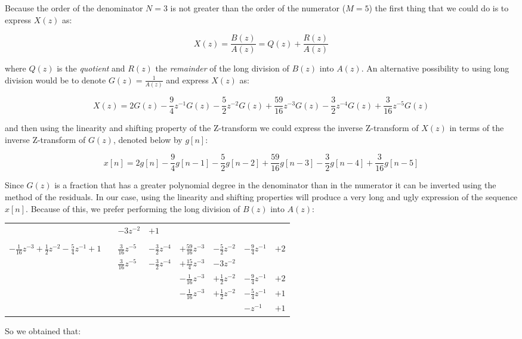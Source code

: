 \documentclass[a4paper,12pt,oneside]{article}
\begin{document}
Because the order of the denominator $N=3$ is not greater than the order of the numerator ($M=5$) the first thing that we could do is to express $X(z)$ as:

\begin{equation}\label{longdivision}
X(z)=\frac{B(z)}{A(z)}=Q(z)+\frac{R(z)}{A(z)}
\end{equation} 

where $Q(z)$ is the \emph{quotient} and $R(z)$ the \emph{remainder} of the long division of $B(z)$ into $A(z)$. An alternative possibility to using long division would be to denote $G(z)=\frac{1}{A(z)}$ and express $X(z)$ as:

\[
X(z) = 2G(z)-\frac{9}{4}z^{-1}G(z)-\frac{5}{2}z^{-2}G(z)+\frac{59}{16}z^{-3} G(z)-\frac{3}{2}z^{-4}G(z)+\frac{3}{16}z^{-5}G(z)
\]

and then using the linearity and shifting property of the Z-transform we could express the inverse Z-transform of $X(z)$ in terms of the inverse Z-transform of $G(z)$, denoted below by $g[n]$:

\[
x[n] = 2g[n]-\frac{9}{4}g[n-1]-\frac{5}{2}g[n-2]+\frac{59}{16}g[n-3]-\frac{3}{2}g[n-4]+\frac{3}{16}g[n-5]
\]

Since $G(z)$ is a fraction that has a greater polynomial degree in the denominator than in the numerator it can be inverted using the method of the residuals. In our case, using the linearity and shifting properties will produce a very long and ugly expression of the sequence $x[n]$. Because of this, we prefer performing the long division of $B(z)$ into $A(z)$:

\begin{tabular}{r|cllllll}
&\qquad&$-3z^{-2}$&$+1$&&&&\\
\cline{2-8}
\\
$-\frac{1}{16}z^{-3}+\frac{1}{2}z^{-2}-\frac{5}{4}z^{-1}+1$&&$\frac{3}{16}z^{-5}$&$-\frac{3}{2}z^{-4}$&$+\frac{59}{16}z^{-3}$&$-\frac{5}{2}z^{-2}$&$-\frac{9}{4}z^{-1}$&$+2$\\
&&$\frac{3}{16}z^{-5}$&$-\frac{3}{2}z^{-4}$&$+\frac{15}{4}z^{-3}$&$-3z^{-2}$&&\\
\cline{3-8}
&&&&$-\frac{1}{16}z^{-3}$&$+\frac{1}{2}z^{-2}$&$-\frac{9}{4}z^{-1}$&$+2$\\
&&&&$-\frac{1}{16}z^{-3}$&$+\frac{1}{2}z^{-2}$&$-\frac{5}{4}z^{-1}$&$+1$\\
\cline{5-8}
&&&&&&$-z^{-1}$&$+1$\\
\end{tabular}

So we obtained that:
\end{document}
